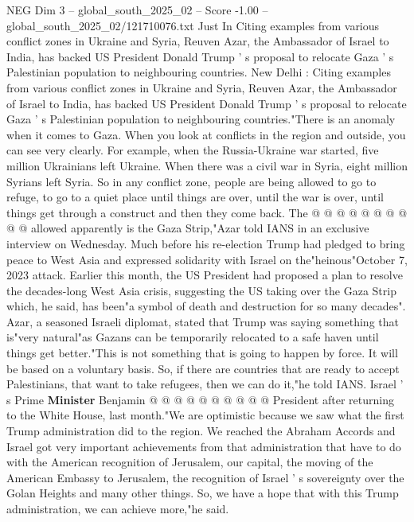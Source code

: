 \begin{textsample}{NEG Dim 3 – global\_south\_2025\_02 – Score -1.00 – global\_south\_2025\_02/121710076.txt}  \label{ex:f3_neg_006}
Just In Citing examples from various conflict zones in Ukraine and Syria, Reuven Azar, the Ambassador of Israel to India, has backed US President Donald Trump ' s proposal to relocate Gaza ' s Palestinian population to neighbouring countries.
New Delhi : Citing examples from various conflict zones in Ukraine and Syria, Reuven Azar, the Ambassador of Israel to India, has backed US President Donald Trump ' s proposal to relocate Gaza ' s Palestinian population to neighbouring countries."There is an anomaly when it comes to Gaza.
When you look at conflicts in the region and outside, you can see very clearly.
For example, when the Russia-Ukraine war started, five million Ukrainians left Ukraine.
When there was a civil war in Syria, eight million Syrians left Syria.
So in any conflict zone, people are being allowed to go to refuge, to go to a quiet place until things are over, until the war is over, until things get through a construct and then they come back.
The @ @ @ @ @ @ @ @ @ @ allowed apparently is the Gaza Strip,"Azar told IANS in an exclusive interview on Wednesday.
Much before his re-election Trump had pledged to bring peace to West Asia and expressed solidarity with Israel on the"heinous"October 7, 2023 attack.
Earlier this month, the US President had proposed a plan to resolve the decades-long West Asia crisis, suggesting the US taking over the Gaza Strip which, he said, has been"a symbol of death and destruction for so many decades".
Azar, a seasoned Israeli diplomat, stated that Trump was saying something that is"very natural"as Gazans can be temporarily relocated to a safe haven until things get better."This is not something that is going to happen by force.
It will be based on a voluntary basis.
So, if there are countries that are ready to accept Palestinians, that want to take refugees, then we can do it,"he told IANS.
Israel ' s Prime \textbf{Minister} Benjamin @ @ @ @ @ @ @ @ @ @ President after returning to the White House, last month."We are optimistic because we saw what the first Trump administration did to the region.
We reached the Abraham Accords and Israel got very important achievements from that administration that have to do with the American recognition of Jerusalem, our capital, the moving of the American Embassy to Jerusalem, the recognition of Israel ' s sovereignty over the Golan Heights and many other things.
So, we have a hope that with this Trump administration, we can achieve more,"he said.

\end{textsample}
